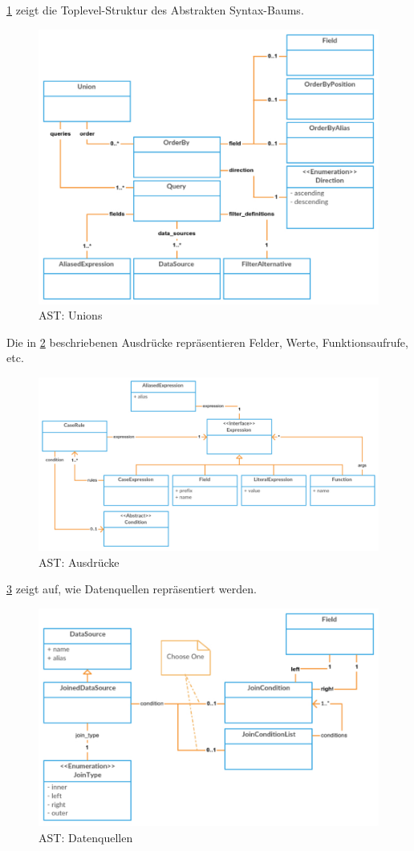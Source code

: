 \cref{fig:pd:odhql-ast-toplevel} zeigt die Toplevel-Struktur des Abstrakten Syntax-Baums.
\begin{figure}[H]
\centering
\includegraphics[width=0.8\linewidth]{fig/odhql-ast-union.pdf}
\caption{AST: Unions}
\label{fig:pd:odhql-ast-toplevel}
\end{figure}

Die in \cref{fig:pd:odhql-ast-expressions} beschriebenen Ausdrücke repräsentieren Felder, Werte, Funktionsaufrufe, etc.
\begin{figure}[H]
\centering
\includegraphics[width=0.8\linewidth]{fig/odhql-ast-expression.pdf}
\caption{AST: Ausdrücke}
\label{fig:pd:odhql-ast-expressions}
\end{figure}

\cref{fig:pd:odhql-ast-datasources} zeigt auf, wie Datenquellen repräsentiert werden.
\begin{figure}[H]
\centering
\includegraphics[width=0.8\linewidth]{fig/odhql-ast-datasources.pdf}
\caption{AST: Datenquellen}
\label{fig:pd:odhql-ast-datasources}
\end{figure}

